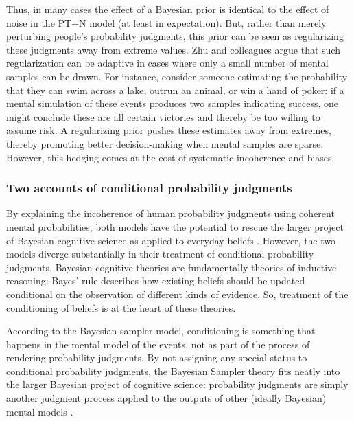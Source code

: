 \documentclass[
  man,floatsintext]{apa6}
\begin{document}
Thus, in many cases the effect of a Bayesian prior is identical to the effect of noise in the PT+N model (at least in expectation). But, rather than merely perturbing people's probability judgments, this prior can be seen as regularizing these judgments away from extreme values. Zhu and colleagues \autocite*{zhu.etal2020} argue that such regularization can be adaptive in cases where only a small number of mental samples can be drawn. For instance, consider someone estimating the probability that they can swim across a lake, outrun an animal, or win a hand of poker: if a mental simulation of these events produces two samples indicating success, one might conclude these are all certain victories and thereby be too willing to assume risk. A regularizing prior pushes these estimates away from extremes, thereby promoting better decision-making when mental samples are sparse. However, this hedging comes at the cost of systematic incoherence and biases.

\hypertarget{two-accounts-of-conditional-probability-judgments}{%
\subsubsection{Two accounts of conditional probability judgments}\label{two-accounts-of-conditional-probability-judgments}}

By explaining the incoherence of human probability judgments using coherent mental probabilities, both models have the potential to rescue the larger project of Bayesian cognitive science as applied to everyday beliefs \autocite{chater.etal2020}. However, the two models diverge substantially in their treatment of conditional probability judgments. Bayesian cognitive theories are fundamentally theories of inductive reasoning: Bayes' rule describes how existing beliefs should be updated conditional on the observation of different kinds of evidence. So, treatment of the conditioning of beliefs is at the heart of these theories.

According to the Bayesian sampler model, conditioning is something that happens in the mental model of the events, not as part of the process of rendering probability judgments. By not assigning any special status to conditional probability judgments, the Bayesian Sampler theory fits neatly into the larger Bayesian project of cognitive science: probability judgments are simply another judgment process applied to the outputs of other (ideally Bayesian) mental models \autocite{chater.etal2020}.
\end{document}
